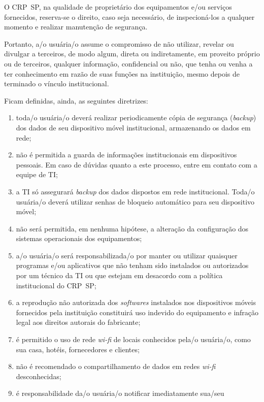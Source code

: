 \documentclass[openright, twoside, a4paper]{memoir}
\begin{document}
O CRP~SP, na qualidade de proprietário dos equipamentos e/ou serviços
fornecidos, reserva-se o direito, caso seja necessário, de
inspecioná-los a qualquer momento e realizar manutenção de segurança.

Portanto, a/o usuária/o assume o compromisso de não utilizar, revelar ou
divulgar a terceiros, de modo algum, direta ou indiretamente, em
proveito próprio ou de terceiros, qualquer informação, confidencial ou
não, que tenha ou venha a ter conhecimento em razão de suas funções na
instituição, mesmo depois de terminado o vínculo institucional.

Ficam definidas, ainda, as seguintes diretrizes:

\begin{enumerate}

\item
    toda/o usuária/o deverá realizar periodicamente cópia de segurança
    (\emph{backup}) dos dados de seu dispositivo móvel institucional,
    armazenando os dados em rede;
\item
    não é permitida a guarda de informações institucionais em dispositivos
    pessoais. Em caso de dúvidas quanto a este processo, entre em contato
    com a equipe de TI;
\item
    a TI só assegurará \emph{backup} dos dados dispostos em rede
    institucional. Toda/o usuária/o deverá utilizar senhas de bloqueio
    automático para seu dispositivo móvel;
\item
    não será permitida, em nenhuma hipótese, a alteração da configuração
    dos sistemas operacionais dos equipamentos;
\item
    a/o usuária/o será responsabilizada/o por manter ou utilizar quaisquer
    programas e/ou aplicativos que não tenham sido instalados ou
    autorizados por um técnico da TI ou que estejam em desacordo com a
    política institucional do CRP~SP;
\item
    a reprodução não autorizada dos \emph{softwares} instalados nos
    dispositivos móveis fornecidos pela instituição constituirá uso
    indevido do equipamento e infração legal aos direitos autorais do
    fabricante;
\item
    é permitido o uso de rede \emph{wi-fi} de locais conhecidos pela/o
    usuária/o, como sua casa, hotéis, fornecedores e clientes;
\item
    não é recomendado o compartilhamento de dados em redes \emph{wi-fi}
    desconhecidas;
\item
    é responsabilidade da/o usuária/o notificar imediatamente sua/seu

\end{enumerate}
\end{document}
